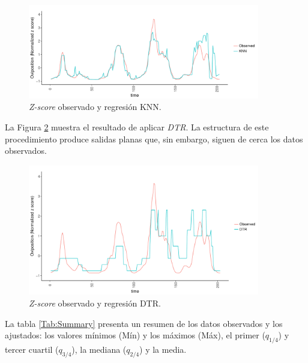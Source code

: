     \begin{figure}[hbt]
    \centering%
    \includegraphics[width=0.9\textwidth]{images/knn}%
    \caption{\textit{Z-score} observado y regresión KNN.}\label{fig:knn}
    \end{figure}


  \par La Figura \ref{fig:dtr} muestra el resultado de aplicar \textit{DTR}.
    La estructura de este procedimiento produce salidas
    planas que, sin embargo, siguen de cerca los datos observados.

    \begin{figure}[hbt]
    \centering%
    \includegraphics[width=0.9\textwidth]{images/dtr}%
    \caption{\textit{Z-score} observado y regresión DTR.}\label{fig:dtr}
    \end{figure}



  \par La tabla \ref{Tab:Summary} presenta un resumen de los datos observados
    y los ajustados: los valores mínimos (Mín) y los máximos (Máx), el
    primer ($q_{1/4}$) y tercer cuartil ($q_{3/4}$), la mediana ($q_{2/4}$)
    y la media.

